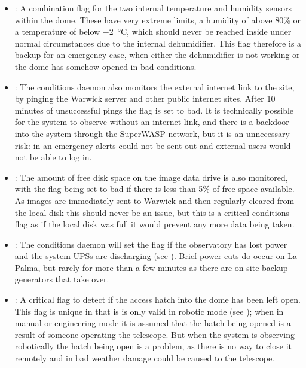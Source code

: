 \begin{colsection}
\begin{colsection}
\begin{itemize}
    \item {}: A combination flag for the two internal temperature and humidity sensors within the dome. These have very extreme limits, a humidity of above 80\% or a temperature of below \SI{-2}{\celsius}, which should never be reached inside under normal circumstances due to the internal dehumidifier. This flag therefore is a backup for an emergency case, when either the dehumidifier is not working or the dome has somehow opened in bad conditions.

    \item {}: The conditions daemon also monitors the external internet link to the site, by pinging the Warwick server and other public internet sites. After 10 minutes of unsuccessful pings the flag is set to bad. It is technically possible for the system to observe without an internet link, and there is a backdoor into the system through the SuperWASP network, but it is an unnecessary risk: in an emergency alerts could not be sent out and external users would not be able to log in.

    \item {}: The amount of free disk space on the image data drive is also monitored, with the flag being set to bad if there is less than 5\% of free space available. As images are immediately sent to Warwick and then regularly cleared from the local disk this should never be an issue, but this is a critical conditions flag as if the local disk was full it would prevent any more data being taken.

    \item {}: The conditions daemon will set the  flag if the observatory has lost power and the system UPSs are discharging (see ). Brief power cuts do occur on La Palma, but rarely for more than a few minutes as there are on-site backup generators that take over.

    \item {}: A critical flag to detect if the access hatch into the dome has been left open. This flag is unique in that is is only valid in robotic mode (see ); when in manual or engineering mode it is assumed that the hatch being opened is a result of someone operating the telescope. But when the system is observing robotically the hatch being open is a problem, as there is no way to close it remotely and in bad weather damage could be caused to the telescope.
\end{itemize}


\end{colsection}
\end{colsection}
